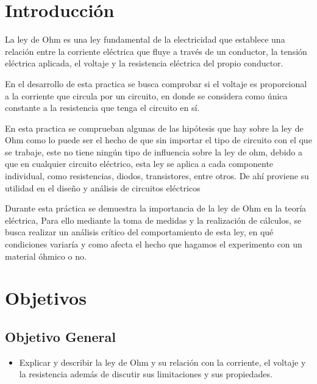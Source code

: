 \documentclass[10pt]{article}
\begin{document}
\begin{multicols}{2}

	\section{Introducción}

	La ley de Ohm es una ley fundamental de la electricidad que establece una
	relación entre la corriente eléctrica que fluye a través de un conductor,
	la tensión eléctrica aplicada, el voltaje y la resistencia eléctrica del
	propio conductor.

	En el desarrollo de esta practica se busca comprobar si el voltaje es
	proporcional a la corriente que circula por un circuito, en donde se
	considera como única constante a la resistencia que tenga el circuito en sí.

	En esta practica se comprueban algunas de las hipótesis que hay sobre la
	ley de Ohm como lo puede ser el hecho de que sin importar el tipo de
	circuito  con el que se trabaje, este  no tiene ningún tipo de influencia
	sobre la ley de ohm, debido a que en cualquier circuito eléctrico, esta ley
	se aplica a cada componente individual, como resistencias, diodos,
	transistores, entre otros.  De ahí proviene su utilidad en el diseño y
	análisis de circuitos eléctricos

	Durante esta práctica se demuestra la importancia de la ley de Ohm en la
	teoría eléctrica, Para ello mediante la toma de medidas y la realización
	de cálculos, se busca realizar un análisis crítico del comportamiento de
	esta ley, en qué condiciones variaría y como afecta el hecho que hagamos
	el experimento con un material óhmico o no.


	\section{Objetivos}

	\subsection{Objetivo General}
	
	\begin{itemize}
		\item Explicar y describir la ley de Ohm y su relación con la
		      corriente, el voltaje y la resistencia además de discutir sus
		      limitaciones y sus propiedades.
	\end{itemize}
	

\end{multicols}
\end{document}
